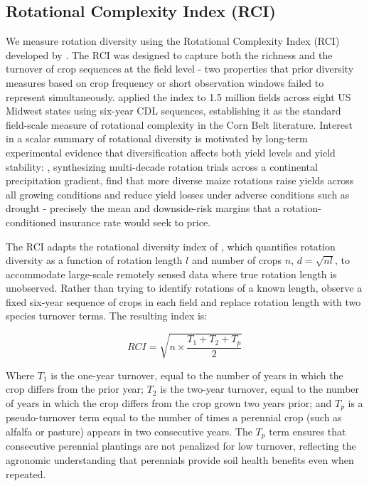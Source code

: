 \documentclass[12pt,letterpaper]{article}
\theoremstyle{remark}
\theoremstyle{remark}
\theoremstyle{plain}
\theoremstyle{definition}
\begin{document}
\subsection{\label{subsec:rci}Rotational Complexity Index (RCI)}	
We measure rotation diversity using the Rotational Complexity Index (RCI) developed by \citet{socolar2021}. The RCI was designed to capture both the richness and the turnover of crop sequences at the field level - two properties that prior diversity measures based on crop frequency or short observation windows failed to represent simultaneously. \citet{socolar2021} applied the index to 1.5 million fields across eight US Midwest states using six-year CDL sequences, establishing it as the standard field-scale measure of rotational complexity in the Corn Belt literature. Interest in a scalar summary of rotational diversity is motivated by long-term experimental evidence that diversification affects both yield levels and yield stability: \citet{bowles2020}, synthesizing multi-decade rotation trials across a continental precipitation gradient, find that more diverse maize rotations raise yields across all growing conditions and reduce yield losses under adverse conditions such as drought - precisely the mean and downside-risk margins that a rotation-conditioned insurance rate would seek to price.

The RCI adapts the rotational diversity index of \citet{Tiemann2015}, which quantifies rotation diversity as a function of rotation length $l$ and number of crops $n$, $d = \sqrt{nl}$, to accommodate large-scale remotely sensed data where true rotation length is unobserved. Rather than trying to identify rotations of a known length, \citet{socolar2021} observe a fixed six-year sequence of crops in each field and replace rotation length with two species turnover terms. The resulting index is:

\begin{equation}
    RCI = \sqrt{n\times \dfrac{T_{1}+T_{2}+T_{p}}{2}}\label{eq:rci}
\end{equation}

Where $T_{1}$ is the one-year turnover, equal to the number of years in which the crop differs from the prior year; $T_{2}$ is the two-year turnover, equal to the number of years in which the crop differs from the crop grown two years prior; and $T_{p}$ is a pseudo-turnover term equal to the number of times a perennial crop (such as alfalfa or pasture) appears in two consecutive years. The $T_{p}$ term ensures that consecutive perennial plantings are not penalized for low turnover, reflecting the agronomic understanding that perennials provide soil health benefits even when repeated. 
\end{document}
